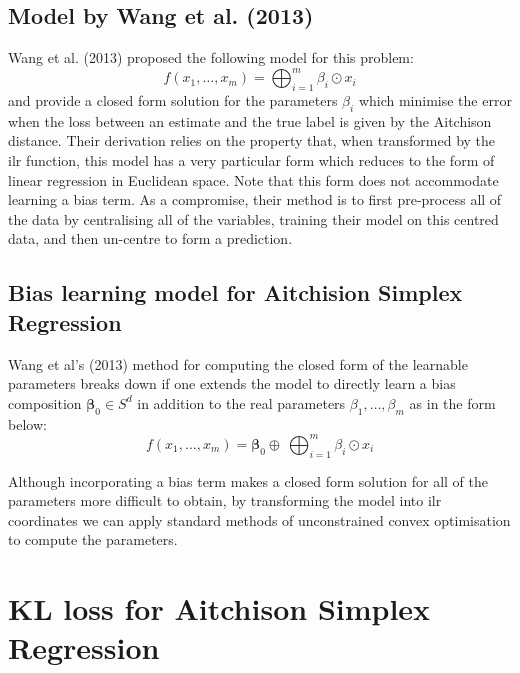 \documentclass[BSc]{usydthesis}
\numberwithin{equation}{chapter}
\theoremstyle{remark}
\begin{document}
\subsection{Model by Wang et al. (2013)}
Wang et al. (2013) proposed the following model for this problem:
$$ f(x_1, \ldots, x_m) = \bigoplus_{i=1}^m \beta_i \odot x_i $$ and provide a closed form solution for the parameters $\beta_i$ which minimise the error when the loss between an estimate and the true label is given by the Aitchison distance. Their derivation relies on the property that, when transformed by the ilr function, this model has a very particular form which reduces to the form of linear regression in Euclidean space. Note that this form does not accommodate learning a bias term. As a compromise, their method is to first pre-process all of the data by centralising all of the variables, training their model on this centred data, and then un-centre to form a prediction. 

\subsection{Bias learning model for Aitchision Simplex Regression}
Wang et al's (2013) method for computing the closed form of the learnable parameters breaks down if one extends the model to directly learn a bias composition $\bm{\beta}_0 \in S^d$ in addition to the real parameters $\beta_1,\ldots, \beta_m$ as in the form below:
$$ f(x_1, \ldots, x_m) = \bm{\beta}_0 \oplus \ \bigoplus_{i=1}^m \beta_i \odot x_i $$

Although incorporating a bias term makes a closed form solution for all of the parameters more difficult to obtain, by transforming the model into ilr coordinates we can apply standard methods of unconstrained convex optimisation to compute the parameters. 

\section{KL loss for Aitchison Simplex Regression}
\end{document}
